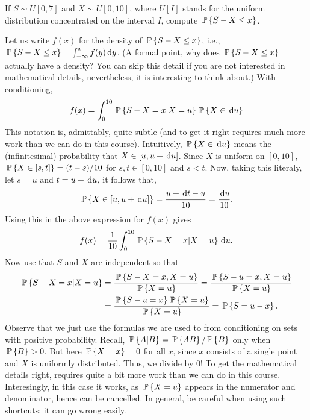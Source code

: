   
\begin{question}
  If $S\sim U[0,7]$ and $X\sim U[0,10]$, where $U[I]$ stands for the
  uniform distribution concentrated on the interval $I$, compute
  $\P{S-X\leq x}$. 


  \begin{solution}
    Let us write $f(x)$ for the density of $\P{S-X\leq x}$, i.e.,
    $\P{S-X\leq x} = \int_{-\infty}^x f(y) \d y$. (A formal point, why
    does $\P{S-X \leq x }$ actually have a density? You can skip this
    detail if you are not interested in mathematical details,
    nevertheless, it is interesting to think about.)
With conditioning, 
\begin{equation*}
  f(x) 
= \int_{0}^{10} \P{S-X = x|X=u} \P{X\in \d u}
\end{equation*}
This notation is, admittably, quite subtle (and to get it right
requires much more work than we can do in this course). Intuitively,
$\P{X\in \d u}$ means the (infinitesimal) probability that
$X\in [u, u+\d u]$. Since $X$ is uniform on $[0,10]$,
$\P{X\in [s,t]} = (t-s)/10$ for $s,t \in [0,10]$ and $s<t$. Now,
taking this literaly, let $s=u$ and $t=u + \d u$, it follows that,
\begin{equation*}
  \P{X\in [u, u+\d u]} = \frac{ u+\d t - u}{10}=\frac{\d u}{10}.
\end{equation*}
Using this in the above expression for $f(x)$ gives
\begin{equation*}
  f(x) = \frac1{10}\int_{0}^{10} \P{S-X = x|X=u} \d u.
\end{equation*}
Now use that
$S$ and $X$ are independent so that
\begin{equation*}
  \begin{split}
\P{S-X = x|X=u}
&= \frac{\P{S-X=x, X=u}}{\P{X=u}} = \frac{\P{S-u=x, X=u}}{\P{X=u}} \\
&=\frac{\P{S-u=x}\P{X=u}}{\P{X=u}}=\P{S=u-x}.
  \end{split}
\end{equation*}
Observe that we just use the formulas we are used to from
conditioning on sets with positive probability. Recall,
$\P{A|B} = \P{AB}/\P{B}$ only when $\P{B}>0$. But here $\P{X=x} = 0$
for all $x$, since $x$ consists of a single point and $X$ is uniformly
distributed. Thus, we divide by $0$! To get the mathematical details
right, requires quite a bit more work than we can do in this course.
Interesingly, in this case it works, as $\P{X=u}$ appears in the
numerator and denominator, hence can be cancelled. In general, be
careful when using such shortcuts; it can go wrong easily.


\end{solution}
\end{question}
